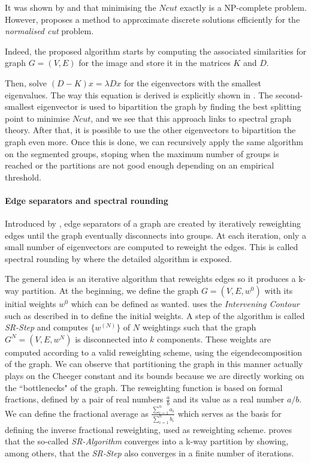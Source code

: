 It was shown by \cite{papadimitriou_npcompleteness_1997} and \cite{shi_normalized_2000} that minimising the \(Ncut\) exactly is a NP-complete problem.
However, \cite{shi_normalized_2000} proposes a method to approximate discrete solutions efficiently for the \textit{normalised cut} problem.

Indeed, the proposed algorithm starts by computing the associated similarities for graph \(G = (V, E)\) for the image and store it in the matrices \(K\) and \(D\).

Then, solve \((D-K)x = \lambda Dx\) for the eigenvectors with the smallest eigenvalues.
The way this equation is derived is explicitly shown in \cite{shi_normalized_2000}.
The second-smallest eigenvector is used to bipartition the graph by finding the best splitting point to minimise \(Ncut\), and we see that this approach links to spectral graph theory.
After that, it is possible to use the other eigenvectors to bipartition the graph even more.
Once this is done, we can recursively apply the same algorithm on the segmented groups, stoping when the maximum number of groups is reached or the partitions are not good enough depending on an empirical threshold.

\paragraph{Edge separators and spectral rounding}
Introduced by \cite{tolliver_graph_2006}, edge separators of a graph are created by iteratively reweighting edges until the graph eventually disconnects into groups.
At each iteration, only a small number of eigenvectors are computed to reweight the edges.
This is called spectral rounding by \cite{tolliver_graph_2006} where the detailed algorithm is exposed.

The general idea is an iterative algorithm that reweights edges so it produces a k-way partition.
At the beginning, we define the graph \(G = (V, E, w^0)\) with its initial weights \(w^0\) which can be defined as wanted.
\cite{tolliver_graph_2006} uses the \textit{Intervening Contour} such as described in \cite{shi_normalized_2000} to define the initial weights.
A step of the algorithm is called \textit{SR-Step} and computes \(\{w^{(N)}\}\) of \(N\) weightings such that the graph \(G^N = (V, E, w^N)\) is disconnected into \(k\) components.
These weights are computed according to a valid reweighting scheme, using the eigendecomposition of the graph.
We can observe that partitioning the graph in this manner actually plays on the Cheeger constant and its bounds because we are directly working on the ``bottlenecks" of the graph.
The reweighting function is based on formal fractions, defined by a pair of real numbers \(\frac{a}{b}\) and its value as a real number \(a/b\).
We can define the fractional average as \(\frac{\sum_{i=1}^n a_i}{\sum_{i=1}^n b_i}\) which serves as the basis for defining the inverse fractional reweighting, used as reweighting scheme.
\cite{tolliver_graph_2006} proves that the so-called \textit{SR-Algorithm} converges into a k-way partition by showing, among others, that the \textit{SR-Step} also converges in a finite number of iterations.

